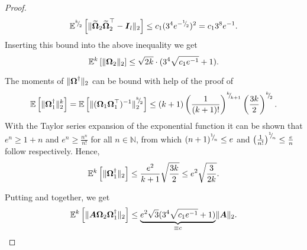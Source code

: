 \documentclass[12pt]{article}
\begin{document}
\begin{proof}
    \begin{equation}
        \mathbb{E}^{{}^{k}{\mskip -5mu/\mskip -3mu}_{2}} \left[ \lVert \widetilde{\boldsymbol{\Omega}}_2 \widetilde{\boldsymbol{\Omega}}_2^{\top} - \boldsymbol{I}_l \rVert _2 \right] \leq c_1 (3^4 e^{-{}^{1}{\mskip -5mu/\mskip -3mu}_{2}})^2 = c_1 3^8 e^{-1}.
    \end{equation}
    Inserting this bound into the above inequality we get
    \begin{equation}
        \mathbb{E}^{k}\left[ \lVert \boldsymbol{\Omega}_2 \rVert _2 \right]
        \leq \sqrt{2k} \cdot (3^4 \sqrt{c_1 e^{-1}} + 1).
        \label{equ:OSE-moment-bound-first}
    \end{equation}

    The moments of $\lVert \boldsymbol{\Omega}^{\dagger} \rVert _2$ can be bound with help of the proof of \cite[lemma B.3]{tropp-2023-randomized-algorithms}
    \begin{equation}
        \mathbb{E}\left[ \lVert \boldsymbol{\Omega}_1^{\dagger} \rVert _2^{k} \right]
        = \mathbb{E}\left[ \lVert ( \boldsymbol{\Omega}_1 \boldsymbol{\Omega}_1^{\top} )^{-1} \rVert _2^{{}^{k}{\mskip -5mu/\mskip -3mu}_{2}} \right]
        \leq \left( k + 1 \right) \left( \frac{1}{(k + 1)!}\right)^{{}^{k}{\mskip -5mu/\mskip -3mu}_{k + 1}} \left( \frac{3 k}{2}\right)^{{}^{k}{\mskip -5mu/\mskip -3mu}_{2}}.
    \end{equation}
    With the Taylor series expansion of the exponential function it can be shown that $e^n \geq 1 + n$ and $e^n \geq \frac{n^n}{n!}$ for all $n \in \mathbb{N}$, from which $(n + 1)^{{}^{1}{\mskip -5mu/\mskip -3mu}_{n}} \leq e$ and $\left( \frac{1}{n!} \right)^{{}^{1}{\mskip -5mu/\mskip -3mu}_{n}} \leq \frac{e}{n}$ follow respectively. Hence,
    \begin{equation}
        \mathbb{E}^{k}\left[ \lVert \boldsymbol{\Omega}_1^{\dagger} \rVert _2 \right]
        \leq \frac{e^2}{k + 1}\sqrt{ \frac{3k}{2} }
        \leq e^2 \sqrt{\frac{3}{2k}}.
        \label{equ:OSE-moment-bound-second}
    \end{equation}

    Putting  and   together, we get
    \begin{equation}
        \mathbb{E}^{k}\left[ \lVert \boldsymbol{A} \boldsymbol{\Omega}_2 \boldsymbol{\Omega}_1^{\dagger} \rVert _2 \right]
        \leq \underbrace{e^2\sqrt{3} (3^4 \sqrt{c_1 e^{-1}} + 1)}_{\equiv c} \lVert \boldsymbol{A} \rVert _2.
    \end{equation}

\end{proof}
\end{document}
